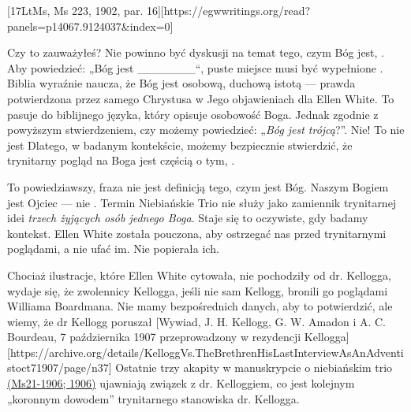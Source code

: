[17LtMs, Ms 223, 1902, par. 16][https://egwwritings.org/read?panels=p14067.9124037&index=0]

Czy to zauważyłeś? Nie powinno być dyskusji na temat tego, czym Bóg jest,  . Aby powiedzieć: „Bóg jest \_\_\_\_\_\_\_“, puste miejsce musi być wypełnione . Biblia wyraźnie naucza, że Bóg jest osobową, duchową istotą — prawda potwierdzona przez samego Chrystusa w Jego objawieniach dla Ellen White. To pasuje do biblijnego języka, który opisuje osobowość Boga. Jednak zgodnie z powyższym stwierdzeniem, czy możemy powiedzieć: „\textit{Bóg jest trójcą}?”. Nie! To nie jest  Dlatego, w badanym kontekście, możemy bezpiecznie stwierdzić, że trynitarny pogląd na Boga jest częścią  o tym, .

To powiedziawszy, fraza  nie jest definicją tego, czym jest Bóg. Naszym Bogiem jest Ojciec — nie . Termin Niebiańskie Trio nie służy jako zamiennik trynitarnej idei \textit{trzech żyjących osób jednego Boga}. Staje się to oczywiste, gdy badamy kontekst. Ellen White została pouczona, aby ostrzegać nas przed trynitarnymi poglądami, a nie ufać im. Nie popierała ich.

Chociaż ilustracje, które Ellen White cytowała, nie pochodziły od dr. Kellogga, wydaje się, że zwolennicy Kellogga, jeśli nie sam Kellogg, bronili go poglądami Williama Boardmana. Nie mamy bezpośrednich danych, aby to potwierdzić, ale wiemy, że dr Kellogg poruszał [Wywiad, J. H. Kellogg, G. W. Amadon i A. C. Bourdeau, 7 października 1907 przeprowadzony w rezydencji Kellogga][https://archive.org/details/KelloggVs.TheBrethrenHisLastInterviewAsAnAdventistoct71907/page/n37] Ostatnie trzy akapity w manuskrypcie o niebiańskim trio \href{https://egwwritings.org/?ref=en_Ms21-1906&para=9754.1}{(Ms21-1906; 1906)} ujawniają związek z dr. Kelloggiem, co jest kolejnym „koronnym dowodem” trynitarnego stanowiska dr. Kellogga.

